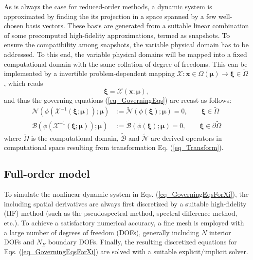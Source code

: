 \documentclass[preprint, 10pt]{elsarticle}
\begin{document}
As is always the case for reduced-order methods, a dynamic system is approximated by finding the its projection in a space spanned by a few well-chosen basis vectors. These basis are generated from a suitable linear combination of some precomputed high-fidelity approximations, termed as snapshots. To ensure the compatibility among snapshots, the variable physical domain has to be addressed. To this end, the variable physical domains will be mapped into a fixed computational domain with the same collation of degree of freedoms. This can be implemented by a invertible problem-dependent mapping $\mathcal{X} : \mathbf{x} \in \Omega\left(\pmb{\mu}\right) \to \pmb{ \xi} \in \widetilde \Omega$, which reads
\begin{equation}
\pmb{ \xi} = \mathcal{X} \left( \mathbf{x}; \pmb{\mu} \right),
\label{eq_Transform}
\end{equation}
and thus the governing equations (\ref{eq_GoverningEqs}) are recast as follows:
\begin{equation}
\begin{aligned}
\mathcal{N}\left(\phi\left( \mathcal{X}^{-1} \left( \pmb{ \xi}; \pmb{\mu} \right) \right); \pmb{\mu}\right)
&:=\widetilde {\mathcal{N}} \left(\phi\left( \pmb{ \xi} \right); \pmb{\mu}\right)
=0,  \qquad \pmb{ \xi} \in \widetilde \Omega
\\
\mathcal{B}\left(\phi\left(\mathcal{X}^{-1} \left( \pmb{ \xi}; \pmb{\mu} \right)\right); \pmb{\mu}\right)
&:=\widetilde {\mathcal{B}} \left(\phi\left( \pmb{ \xi} \right); \pmb{\mu}\right)
=0,  \qquad \pmb{ \xi} \in \partial \widetilde \Omega
\end{aligned}
\label{eq_GoverningEqsForXi}
\end{equation}
where $\widetilde \Omega$ is the computational domain, $\widetilde {\mathcal{B}}$ and $\widetilde {\mathcal{N}}$ are derived operators in computational space resulting from transformation Eq. (\ref{eq_Transform}).



\subsection{Full-order model}
To simulate the nonlinear dynamic system in Eqs. (\ref{eq_GoverningEqsForXi}), the including spatial derivatives are always first discretized by a suitable high-fidelity (HF) method (such as the pseudospectral method, spectral difference method, etc.). To achieve a satisfactory numerical accuracy, a fine mesh is employed with a large number of degrees of freedom (DOFs), generally including $N$ interior DOFs and $N_B$ boundary DOFs. Finally, the resulting discretized equations for  Eqs. (\ref{eq_GoverningEqsForXi}) are solved with a suitable explicit/implicit solver.
\end{document}
